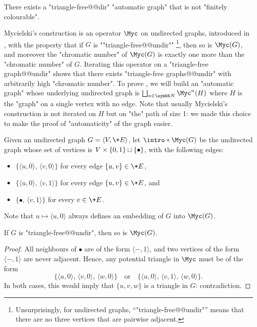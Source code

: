 \begin{proposition}
	\AP\label{prop:automatic-graph-not-fin-colourable}
	There exists a "triangle-free@@dir" "automatic graph" that is not "finitely colourable".
\end{proposition}

Mycielski's construction is an operator $\Myc$ on undirected graphs,
introduced in \cite{Mycielski55Coloriage}, with the property that if $G$ is \AP""triangle-free@@undir""%
\footnote{Unsurprisingly, for undirected graphs, ``"triangle-free@@undir"'' means that there are no
three vertices that are pairwise adjacent.},
then so is $\Myc(G)$, and moreover
the "chromatic number" of $\Myc(G)$ is exactly one more than the "chromatic number" of $G$.
Iterating this operator on a "triangle-free graph@@undir" shows that there exists
"triangle-free graphs@@undir" with arbitrarily high "chromatic number".
To prove , we will build
an "automatic graph" whose underlying undirected graph is
$\bigdcup_{n\in\N} \Myc^n(H)$ where $H$ is the "graph" on a single vertex with no edge.
Note that usually Mycielski's construction is not iterated on $H$ but on "the"
path of size 1: we made this choice to make the proof of "automaticity" of the graph
easier.

\begin{definition}
	Given an undirected graph $G = \langle V, \+E \rangle$, let
	\AP$\intro*\Myc(G)$ be the undirected graph whose set of vertices is
	$V\times\{0,1\} \sqcup \{\bullet\}$, with the following edges:
	\begin{itemize}
		\item $\{\langle u, 0 \rangle,\, \langle v, 0 \rangle\}$
			for every edge $\{ u,v \} \in \+E$,
		\item $\{\langle u, 0 \rangle,\, \langle v, 1 \rangle\}$
			for every edge $\{ u,v \} \in \+E$, and
		\item $\{ \bullet,\, \langle v, 1 \rangle\}$
			for every $v \in \+E$.
	\end{itemize}
\end{definition}

Note that $u \mapsto \langle u,0\rangle$ always defines an embedding of
$G$ into $\Myc(G)$.

\begin{property}
	\label{prop:triangle-free}
	If $G$ is "triangle-free@@undir", then so is $\Myc(G)$.
\end{property}

\begin{proof}
	All neighbours of $\bullet$ are of the form $\langle -, 1\rangle$,
	and two vertices of the form $\langle -, 1\rangle$ are never adjacent.
	Hence, any potential triangle in $\Myc$ must be of the form
	\[
	\{
		\langle u, 0 \rangle,\,
		\langle v, 0 \rangle,\,
		\langle w, 0 \rangle
	\}
	\quad\text{or}\quad
	\{
		\langle u, 0 \rangle,\,
		\langle v, 1 \rangle,\,
		\langle w, 0 \rangle
	\}.
	\]
	In both cases, this would imply that $\{u,v,w\}$ is a triangle in $G$:
	contradiction.
\end{proof}

